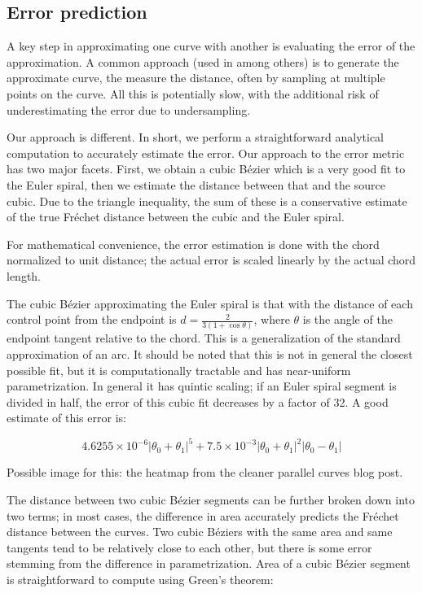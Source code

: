 \documentclass[sigconf, authordraft]{acmart}
\begin{document}
\subsection{Error prediction}

A key step in approximating one curve with another is evaluating the error of the approximation. A common approach (used in \cite{Nehab2020} among others) is to generate the approximate curve, the measure the distance, often by sampling at multiple points on the curve. All this is potentially slow, with the additional risk of underestimating the error due to undersampling.

Our approach is different. In short, we perform a straightforward analytical computation to accurately estimate the error. Our approach to the error metric has two major facets. First, we obtain a cubic Bézier which is a very good fit to the Euler spiral, then we estimate the distance between that and the source cubic. Due to the triangle inequality, the sum of these is a conservative estimate of the true Fréchet distance between the cubic and the Euler spiral.

For mathematical convenience, the error estimation is done with the chord normalized to unit distance; the actual error is scaled linearly by the actual chord length.

The cubic Bézier approximating the Euler spiral is that with the distance of each control point from the endpoint is $d = \frac{2}{3(1 + \cos \theta)}$, where $\theta$ is the angle of the endpoint tangent relative to the chord. This is a generalization of the standard approximation of an arc. It should be noted that this is not in general the closest possible fit, but it is computationally tractable and has near-uniform parametrization. In general it has quintic scaling; if an Euler spiral segment is divided in half, the error of this cubic fit decreases by a factor of 32. A good estimate of this error is:

\[
    4.6255\times10^{-6}|\theta_0+\theta_1|^5 + 7.5\times10^{-3}|\theta_0+\theta_1|^2|\theta_0-\theta_1|
\]

Possible image for this: the heatmap from the cleaner parallel curves blog post.

The distance between two cubic Bézier segments can be further broken down into two terms; in most cases, the difference in area accurately predicts the Fréchet distance between the curves. Two cubic Béziers with the same area and same tangents tend to be relatively close to each other, but there is some error stemming from the difference in parametrization. Area of a cubic Bézier segment is straightforward to compute using Green's theorem:
\end{document}
